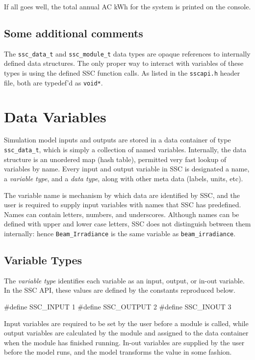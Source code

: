 \documentclass{article}
\begin{document}
If all goes well, the total annual AC kWh for the system is printed on the console.

\subsection{Some additional comments}

The \texttt{ssc\_data\_t} and \texttt{ssc\_module\_t} data types are opaque references to internally defined data structures.  The only proper way to interact with variables of these types is using the defined SSC function calls.  As listed in the \texttt{sscapi.h} header file, both are typedef'd as \texttt{void*}.


\section{Data Variables}
\label{sec_variables}

Simulation model inputs and outputs are stored in a data container of type \texttt{ssc\_data\_t}, which is simply a collection of named variables.  Internally, the data structure is an unordered map (hash table), permitted very fast lookup of variables by name.  Every input and output variable in SSC is designated a name, a \emph{variable type}, and a \emph{data type}, along with other meta data (labels, units, etc). 

The variable name is mechanism by which data are identified by SSC, and the user is required to supply input variables with names that SSC has predefined.  Names can contain letters, numbers, and underscores.  Although names can be defined with upper and lower case letters, SSC does not distinguish between them internally: hence \texttt{Beam\_Irradiance} is the same variable as \texttt{beam\_irradiance}.

\subsection{Variable Types}

The \emph{variable type} identifies each variable as an input, output, or in-out variable.  In the SSC API, these values are defined by the constants reproduced below.

\begin{verbatimtab}
#define SSC_INPUT 1
#define SSC_OUTPUT 2
#define SSC_INOUT 3
\end{verbatimtab}

Input variables are required to be set by the user before a module is called, while output variables are calculated by the module and assigned to the data container when the module has finished running.  In-out variables are supplied by the user before the model runs, and the model transforms the value in some fashion.
\end{document}
